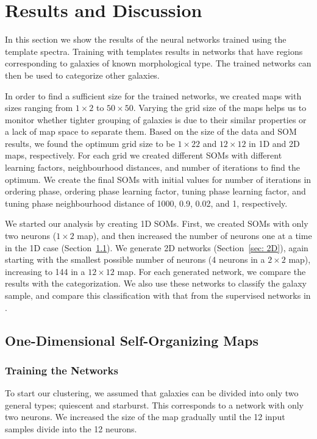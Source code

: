 \section{Results and Discussion}
\label{sec: result}

    In this section we show the results of the neural networks trained using the  template spectra.
    Training with  templates results in networks that have regions corresponding to galaxies of known morphological type. 
    The trained networks can then be used to categorize other galaxies.

    In order to find a sufficient size for the trained networks, we created maps with sizes ranging from $1\times2$ to $50\times50$.
    Varying the grid size of the maps helps us to monitor whether tighter grouping of galaxies is due to their similar properties or a lack of map space to separate them.
   Based on the size of the data and SOM results, we found the optimum grid size to be $1\times22$ and $12\times12$ in 1D and 2D maps, respectively. 
    For each grid we created different SOMs with different learning factors, neighbourhood distances, and number of iterations to find the optimum.
    We create the final SOMs with initial values for number of iterations in ordering phase, ordering phase learning factor, tuning phase learning factor, and tuning phase neighbourhood distance of 1000, 0.9, 0.02, and 1, respectively.
   
    We started our analysis by creating 1D SOMs. 
    First, we created SOMs with only two neurons ($1\times2$ map), and then increased the number of neurons one at a time in the 1D case (Section~\ref{sec: 1D_somz}).
    We generate 2D networks (Section~\ref{sec: 2D}),  again starting with the smallest possible number of neurons (4 neurons in a $2\times2$ map), increasing to 144 in a $12\times12$ map.    
    For each generated network, we compare the results with the  categorization.
    We also use these networks to classify the  galaxy sample, and compare this classification with that from the supervised networks in .

    \subsection{One-Dimensional Self-Organizing Maps}
    \label{sec: 1D_somz}
        \subsubsection{Training the Networks}
        \label{sec: 1Dt}
            To start our clustering, we assumed that galaxies can be divided into only two general types; quiescent and starburst.
            This corresponds to a network with only two neurons.
            We increased the size of the map gradually until the 12 input samples divide into the 12 neurons. 
        
